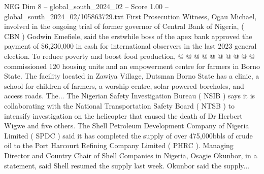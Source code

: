 \begin{textsample}{NEG Dim 8 – global\_south\_2024\_02 – Score 1.00 – global\_south\_2024\_02/105863729.txt}
First Prosecution Witness, Ogau Michael, involved in the ongoing trial of former governor of Central Bank of Nigeria, ( CBN ) Godwin Emefiele, said the erstwhile boss of the apex bank approved the payment of \$6,230,000 in cash for international observers in the last 2023 general election.
To reduce poverty and boost food production, @ @ @ @ @ @ @ @ @ @ commissioned 120 housing units and an empowerment centre for farmers in Borno State.
The facility located in Zawiya Village, Dutsman Borno State has a clinic, a school for children of farmers, a worship centre, solar-powered boreholes, and access roads.
The...
The Nigerian Safety Investigation Bureau ( NSIB ) says it is collaborating with the National Transportation Safety Board ( NTSB ) to intensify investigation on the helicopter that caused the death of Dr Herbert Wigwe and five others.
The Shell Petroleum Development Company of Nigeria Limited ( SPDC ) said it has completed the supply of over 475,000bbls of crude oil to the Port Harcourt Refining Company Limited ( PHRC ).
Managing Director and Country Chair of Shell Companies in Nigeria, Osagie Okunbor, in a statement, said Shell resumed the supply last week.
Okunbor said the supply...

\end{textsample}
